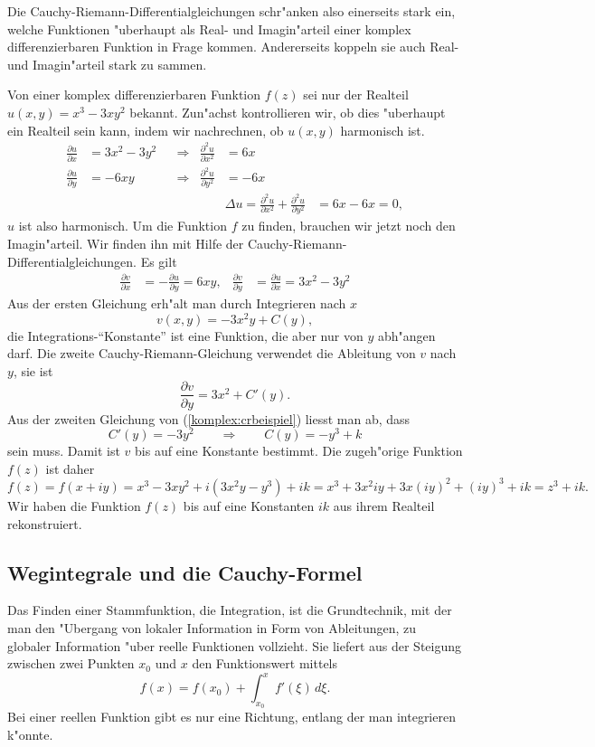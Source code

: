 Die Cauchy-Riemann-Differentialgleichungen schr"anken also einerseits stark
ein, welche Funktionen "uberhaupt als Real- und Imagin"arteil einer
komplex differenzierbaren Funktion in Frage kommen.
Andererseits koppeln sie auch Real- und Imagin"arteil stark zu sammen.

\begin{beispiel}
Von einer komplex differenzierbaren Funktion $f(z)$ sei nur der Realteil
$u(x,y)=x^3 -3xy^2$ bekannt.
Zun"achst kontrollieren wir, ob dies "uberhaupt ein Realteil sein kann,
indem wir nachrechnen, ob $u(x,y)$ harmonisch ist.
\begin{equation*}
\begin{aligned}
\frac{\partial u}{\partial x}
&=
3x^2-3y^2
&&\Rightarrow&
\frac{\partial^2 u}{\partial x^2}
&=
6x
\\
\frac{\partial u}{\partial y}
&=
-6xy
&&\Rightarrow&
\frac{\partial^2 u}{\partial y^2}
&=
-6x
\\
&&&&&\Delta u=\frac{\partial^2u}{\partial x^2}+\frac{\partial^2u}{\partial y^2}&=6x-6x=0,
\end{aligned}
\end{equation*}
$u$ ist also harmonisch.
Um die Funktion $f$ zu finden, brauchen wir jetzt noch den Imagin"arteil.
Wir finden ihn mit Hilfe der Cauchy-Riemann-Differentialgleichungen.
Es gilt
\begin{equation}
\begin{aligned}
\frac{\partial v}{\partial x}
&=
-\frac{\partial u}{\partial y}=6xy,
&
\frac{\partial v}{\partial y}
&=
\frac{\partial u}{\partial x}=3x^2-3y^2
\end{aligned}
\label{komplex:crbeispiel}
\end{equation}
Aus der ersten Gleichung erh"alt man durch Integrieren nach $x$ 
\[
v(x,y)=-3x^2y + C(y),
\]
die Integrations-``Konstante'' ist eine Funktion, die aber nur von $y$
abh"angen darf.
Die zweite Cauchy-Riemann-Gleichung verwendet die Ableitung von $v$ nach $y$,
sie ist
\[
\frac{\partial v}{\partial y}=3x^2+C'(y).
\]
Aus der zweiten Gleichung von (\ref{komplex:crbeispiel}) liesst man
ab, dass
\[
C'(y)=-3y^2
\qquad\Rightarrow\qquad
C(y)=-y^3+k
\]
sein muss.
Damit ist $v$ bis auf eine Konstante bestimmt.
Die zugeh"orige Funktion $f(z)$ ist daher
\[
f(z)=f(x+iy)=x^3-3xy^2+i(3x^2y-y^3)+ik
=x^3 + 3x^2iy + 3x(iy)^2+(iy)^3+ik=z^3+ik.
\]
Wir haben die Funktion $f(z)$ bis auf eine Konstanten $ik$ 
aus ihrem Realteil rekonstruiert.
\end{beispiel}

\subsection{Wegintegrale und die Cauchy-Formel}
Das Finden einer Stammfunktion, die Integration, ist die Grundtechnik,
mit der man den "Ubergang von lokaler Information in Form von Ableitungen,
zu globaler Information "uber reelle Funktionen vollzieht.
Sie liefert aus der Steigung zwischen zwei Punkten $x_0$ und $x$ den
Funktionswert mittels
\[
f(x)=f(x_0)+\int_{x_0}^xf'(\xi)\,d\xi.
\]
Bei einer reellen Funktion gibt es nur eine Richtung, entlang der man
integrieren k"onnte.

